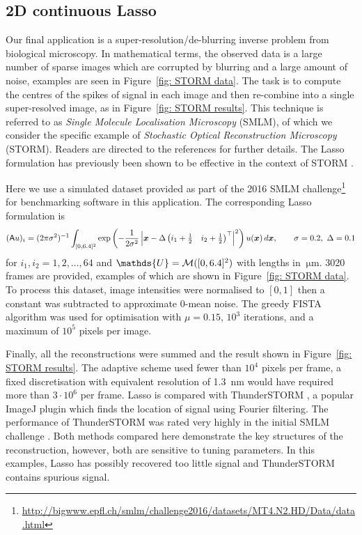 \documentclass[smallextended]{svjour3}
\let\F\mathds\let\C\mathcal\newcommand{\R}{\F{R}}\newcommand{\A}{\tens{A}}
\newcommand{\1}{\F{1}}
\newcommand*{\varf}[1]{%
	\IfEqCase{#1}{%
		{0}{u}%
		{1}{v}%
		{2}{w}%
	}[u#1]%
}
\newcommand*{\spcf}[1]{%
	\IfEqCase{#1}{%
		{0}{\F{U}}%
		{1}{\F{V}}%
		{2}{\F{W}}%
	}[\F{U}#1]%
}
\newcommand*{\varx}[1]{%
	\IfEqCase{#1}{%
		{0}{x}%
		{1}{y}%
		{2}{z}%
		{3}{r}%
	}[x#1]%
}
\newcommand*{\vvarx}[1]{\vec{\varx{#1}}}
\begin{document}
	\subsection{2D continuous Lasso}
	Our final application is a super-resolution/de-blurring inverse problem from biological microscopy. In mathematical terms, the observed data is a large number of sparse images which are corrupted by blurring and a large amount of noise, examples are seen in Figure~\ref{fig: STORM data}. The task is to compute the centres of the spikes of signal in each image and then re-combine into a single super-resolved image, as in Figure~\ref{fig: STORM results}. This technique is referred to as \emph{Single Molecule Localisation Microscopy} (SMLM), of which we consider the specific example of \emph{Stochastic Optical Reconstruction Microscopy} (STORM). Readers are directed to the references \cite{Sage2015,Sage2019,Schermelleh2019} for further details. The Lasso formulation has previously been shown to be effective in the context of STORM \cite{Huang2017,Denoyelle2019}.
	
	Here we use a simulated dataset provided as part of the 2016 SMLM challenge\footnote{\url{http://bigwww.epfl.ch/smlm/challenge2016/datasets/MT4.N2.HD/Data/data.html}} for benchmarking software in this application. The corresponding Lasso formulation is 
	\begin{equation}
		(\A\varf0)_{i} = (2\pi\sigma^2)^{-1}\int_{[0,6.4]^2} \exp\left(-\frac{1}{2\sigma^2}\left|\vvarx0- \Delta\begin{pmatrix}i_1+\tfrac12 & i_2+\tfrac12\end{pmatrix}^\top \right|^2\right)\varf0(\vvarx0)\,d\vvarx0, \qquad \sigma=0.2,\ \Delta=0.1
	\end{equation}
	for $i_1,i_2 = 1,2,\ldots,64$ and $\spcf0=\C M([0,6.4]^2)$ with lengths in $\SI{}{\micro\meter}$. 3020 frames are provided, examples of which are shown in Figure~\ref{fig: STORM data}. To process this dataset, image intensities were normalised to $[0,1]$ then a constant was subtracted to approximate 0-mean noise. The greedy FISTA algorithm was used for optimisation with $\mu=0.15$, $10^3$ iterations, and a maximum of $10^5$ pixels per image. 
	
	Finally, all the reconstructions were summed and the result shown in Figure~\ref{fig: STORM results}. The adaptive scheme used fewer than $10^4$ pixels per frame, a fixed discretisation with equivalent resolution of \SI{1.3}{\nano\meter} would have required more than $3\cdot10^6$ per frame. Lasso is compared with ThunderSTORM \cite{Ovesny2014}, a popular ImageJ plugin \cite{Schindelin2012} which finds the location of signal using Fourier filtering. The performance of ThunderSTORM was rated very highly in the initial SMLM challenge \cite{Sage2015}. Both methods compared here demonstrate the key structures of the reconstruction, however, both are sensitive to tuning parameters. In this examples, Lasso has possibly recovered too little signal and ThunderSTORM contains spurious signal. 
	
\end{document}
